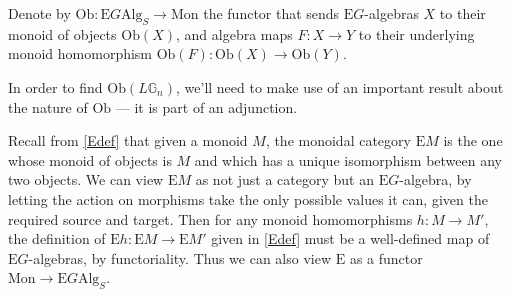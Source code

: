 \begin{defn}\label{Obdef} Denote by $\mathrm{Ob}: \mathrm{E}G\mathrm{Alg}_S \to \mathrm{Mon}$ the functor that sends $\mathrm{E}G$-algebras $X$ to their monoid of objects $\mathrm{Ob}(X)$, and algebra maps $F: X \to Y$ to their underlying monoid homomorphism $\mathrm{Ob}(F): \mathrm{Ob}(X) \to \mathrm{Ob}(Y)$. \end{defn}

In order to find $\mathrm{Ob}(L\mathbb{G}_n)$, we'll need to make use of an important result about the nature of $\mathrm{Ob}$ --- it is part of an adjunction.

\begin{defn}\label{Edef2} Recall from \cref{Edef} that given a monoid $M$, the monoidal category $\mathrm{E}M$ is the one whose monoid of objects is $M$ and which has a unique isomorphism between any two objects. We can view $\mathrm{E}M$ as not just a category but an $\mathrm{E}G$-algebra, by letting the action on morphisms take the only possible values it can, given the required source and target. Then for any monoid homomorphisms $h: M \to M'$, the definition of $\mathrm{E}h: \mathrm{E}M \to \mathrm{E}M'$ given in \cref{Edef} must be a well-defined map of $\mathrm{E}G$-algebras, by functoriality. Thus we can also view $\mathrm{E}$ as a functor $\mathrm{Mon} \to \mathrm{E}G\mathrm{Alg}_S$.
 \end{defn}

